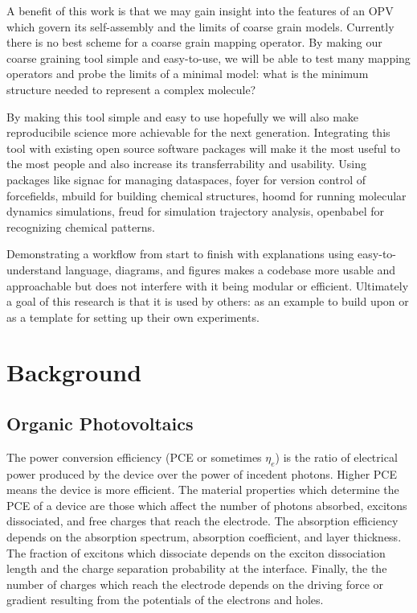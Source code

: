 A benefit of this work is that we may gain insight into the features of an OPV which govern its self-assembly and the limits of coarse grain models.
Currently there is no best scheme for a coarse grain mapping operator.
By making our coarse graining tool simple and easy-to-use, we will be able to test many mapping operators and probe the limits of a minimal model: what is the minimum structure needed to represent a complex molecule?

By making this tool simple and easy to use hopefully we will also make reproducibile science more achievable for the next generation. 
Integrating this tool with existing open source software packages will make it the most useful to the most people and also increase its transferrability and usability.
Using packages like signac for managing dataspaces, foyer for version control of forcefields, mbuild for building chemical structures, hoomd for running molecular dynamics simulations, freud for simulation trajectory analysis, openbabel for recognizing chemical patterns.

Demonstrating a workflow from start to finish with explanations using easy-to-understand language, diagrams, and figures makes a codebase more usable and approachable but does not interfere with it being modular or efficient.
Ultimately a goal of this research is that it is used by others: as an example to build upon or as a template for setting up their own experiments.

\section*{Background}

\subsection*{Organic Photovoltaics}

The power conversion efficiency (PCE or sometimes $\eta_{e}$) is the ratio of electrical power produced by the device over the power of incedent photons.
Higher PCE means the device is more efficient.  
The material properties which determine the PCE of a device are those which affect the number of photons absorbed, excitons dissociated, and free charges that reach the electrode.
The absorption efficiency depends on the absorption spectrum, absorption coefficient, and layer thickness.
The fraction of excitons which dissociate depends on the exciton dissociation length and the charge separation probability at the interface.
Finally, the the number of charges which reach the electrode depends on the driving force or gradient resulting from the potentials of the electrons and holes\cite{Hoppe2004}.


